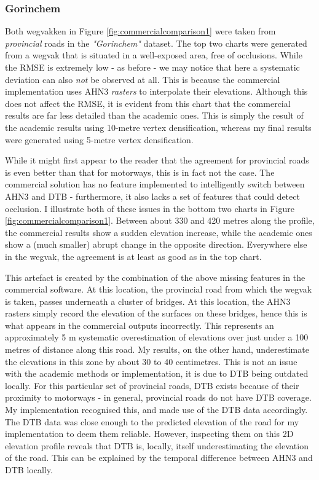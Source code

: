 \subsubsection{Gorinchem}

Both wegvakken in Figure \ref{fig:commercialcomparison1} were taken from \textit{provincial} roads in the \textit{"Gorinchem"} dataset. The top two charts were generated from a wegvak that is situated in a well-exposed area, free of occlusions. While the RMSE is extremely low - as before - we may notice that here a systematic deviation can also \textit{not} be observed at all. This is because the commercial implementation uses AHN3 \textit{rasters} to interpolate their elevations. Although this does not affect the RMSE, it is evident from this chart that the commercial results are far less detailed than the academic ones. This is simply the result of the academic results using 10-metre vertex densification, whereas my final results were generated using 5-metre vertex densification.

While it might first appear to the reader that the agreement for provincial roads is even better than that for motorways, this is in fact not the case. The commercial solution has no feature implemented to intelligently switch between AHN3 and DTB - furthermore, it also lacks a set of features that could detect occlusion. I illustrate both of these issues in the bottom two charts in Figure \ref{fig:commercialcomparison1}. Between about 330 and 420 metres along the profile, the commercial results show a sudden elevation increase, while the academic ones show a (much smaller) abrupt change in the opposite direction. Everywhere else in the wegvak, the agreement is at least as good as in the top chart.

This artefact is created by the combination of the above missing features in the commercial software. At this location, the provincial road from which the wegvak is taken, passes underneath a cluster of bridges. At this location, the AHN3 rasters simply record the elevation of the surfaces on these bridges, hence this is what appears in the commercial outputs incorrectly. This represents an approximately 5 m systematic overestimation of elevations over just under a 100 metres of distance along this road. My results, on the other hand, underestimate the elevations in this zone by about 30 to 40 centimetres. This is not an issue with the academic methods or implementation, it is due to DTB being outdated locally. For this particular set of provincial roads, DTB exists because of their proximity to motorways - in general, provincial roads do not have DTB coverage. My implementation recognised this, and made use of the DTB data accordingly. The DTB data was close enough to the predicted elevation of the road for my implementation to deem them reliable. However, inspecting them on this 2D elevation profile reveals that DTB is, locally, itself underestimating the elevation of the road. This can be explained by the temporal difference between AHN3 and DTB locally.

